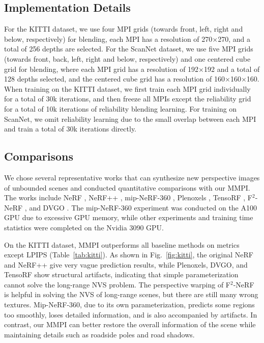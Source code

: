 \documentclass[letterpaper, 10 pt, conference]{ieeeconf}  %
\begin{document}
\subsection{Implementation Details}

For the KITTI dataset, we use four MPI grids (towards front, left, right and below, respectively) for blending, each MPI has a resolution of 270$\times$270, and a total of 256 depths are selected. For the ScanNet dataset, we use five MPI grids (towards front, back, left, right and below, respectively) and one centered cube grid for blending, where each MPI grid has a resolution of 192$\times$192 and a total of 128 depths selected, and the centered cube grid has a resolution of 160$\times$160$\times$160. When training on the KITTI dataset, we first train each MPI grid individually for a total of 30k iterations, and then freeze all MPIs except the reliability grid for a total of 10k iterations of reliability blending learning. For training on ScanNet, we omit reliability learning due to the small overlap between each MPI and train a total of 30k iterations directly.

\subsection{Comparisons}

We chose several representative works that can synthesize new perspective images of unbounded scenes and conducted quantitative comparisons with our MMPI. The works include NeRF \cite{mildenhall2020nerf}, NeRF++ \cite{zhang2020nerf++}, mip-NeRF-360 \cite{barron2022mip}, Plenoxels \cite{yu2021plenoxels}, TensoRF \cite{chen2022tensorf}, F$^2$-NeRF \cite{wang2023f}, and DVGO \cite{sun2022improved}. The mip-NeRF-360 experiment was conducted on the A100 GPU due to excessive GPU memory, while other experiments and training time statistics were completed on the Nvidia 3090 GPU.

On the KITTI dataset, MMPI outperforms all baseline methods on metrics except LPIPS (Table~\ref{tab:kitti}). As shown in Fig.~\ref{fig:kitti}, the original NeRF and NeRF++ give very vague prediction results, while Plenoxels, DVGO, and TensoRF show structural artifacts, indicating that simple parameterization cannot solve the long-range NVS problem. The perspective warping of F$^2$-NeRF is helpful in solving the NVS of long-range scenes, but there are still many wrong textures. Mip-NeRF-360, due to its own parameterization, predicts some regions too smoothly, loses detailed information, and is also accompanied by artifacts. In contrast, our MMPI can better restore the overall information of the scene while maintaining details such as roadside poles and road shadows.
\end{document}
